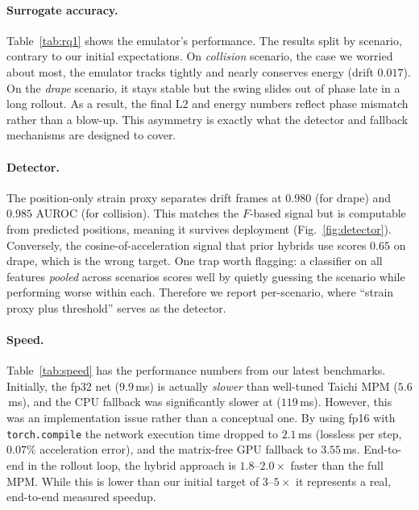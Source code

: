 \documentclass{article}
\begin{document}
\paragraph{Surrogate accuracy.} Table~\ref{tab:rq1} shows the emulator's performance. 
The results split by scenario, contrary to our initial expectations. On \emph{collision} scenario, the case
we worried about most, the emulator tracks tightly and nearly conserves energy (drift $0.017$).
On the \emph{drape} scenario, it stays stable but the swing slides out of phase late in a long rollout. As a result, the final L2 and energy numbers reflect phase mismatch rather than a blow-up.
This asymmetry is exactly what the detector and fallback mechanisms are designed to cover.

\paragraph{Detector.} The position-only strain proxy separates drift frames at
$0.980$ (for drape) and $0.985$ AUROC (for collision). This matches the $F$-based signal but
is computable from predicted positions, meaning it survives deployment (Fig.~\ref{fig:detector}).
Conversely, the cosine-of-acceleration signal that prior hybrids use scores $0.65$ on drape, which is the
wrong target. One trap worth flagging: a classifier on all features \emph{pooled}
across scenarios scores well by quietly guessing the scenario while performing worse
within each. Therefore we report per-scenario, where ``strain proxy plus threshold'' serves as the
detector.

\paragraph{Speed.} Table~\ref{tab:speed} has the performance numbers from our latest benchmarks. Initially, the fp32 net ($9.9$\,ms) is actually \emph{slower} than well-tuned Taichi
MPM ($5.6$\,ms), and the CPU fallback was significantly slower at ($119$\,ms). However, this was an implementation issue rather than a conceptual one. By using fp16 with \texttt{torch.compile} the network execution time dropped to
$2.1$\,ms (lossless per step, $0.07\%$ acceleration error), and the matrix-free GPU
fallback to $3.55$\,ms. End-to-end in the rollout loop, the hybrid approach is
$1.8$--$2.0\times$ faster than the full MPM. While this is lower than our initial target of $3$--$5\times$ it represents a real, end-to-end measured speedup.
\end{document}
